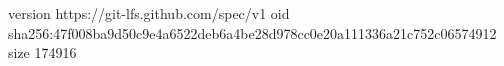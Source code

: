 version https://git-lfs.github.com/spec/v1
oid sha256:47f008ba9d50c9e4a6522deb6a4be28d978cc0e20a111336a21c752c06574912
size 174916
